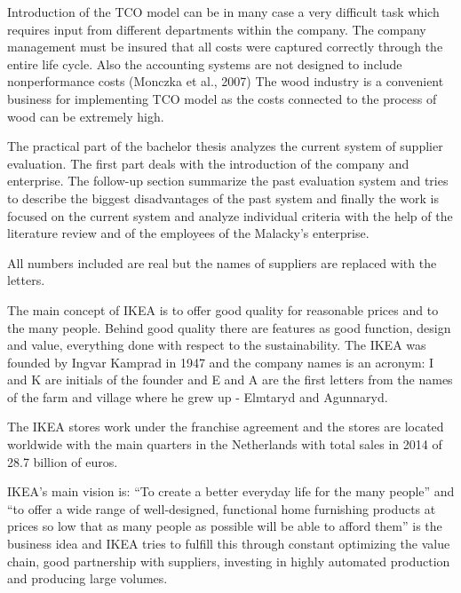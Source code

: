 \documentclass[oneside,12pt]{article}%
\begin{document}
Introduction of the TCO model can be in many case a very difficult task which requires input from different departments within the company. The company management must be insured that all costs were captured correctly through the entire life cycle. Also the accounting systems are not designed to include nonperformance costs (Monczka et al., 2007) The wood industry is a convenient business for implementing TCO model as the costs connected to the process of wood can be extremely high.





The practical part of the bachelor thesis analyzes the current system of supplier evaluation. The first part deals with the introduction of the company and enterprise. The follow-up section summarize the past evaluation system and tries to describe the biggest disadvantages of the past system and finally the work is focused on the current system and analyze individual criteria with the help of the literature review and of the employees of the Malacky’s enterprise. \par
All numbers included are real but the names of suppliers are replaced with the letters.

The main concept of IKEA is to offer good quality for reasonable prices and to the many people. Behind good quality there are features as good function, design and value, everything done with respect to the sustainability. The IKEA was founded by Ingvar Kamprad in 1947 and the company names is an acronym: I and K are initials of the founder and E and A are the first letters from the names of the farm and village where he grew up - Elmtaryd and Agunnaryd. \par
The IKEA stores work under the franchise agreement and the stores are located worldwide with the main quarters in the Netherlands with total sales in 2014 of 28.7 billion of euros. \par
IKEA’s main vision is: “To create a better everyday life for the many people” and “to offer a wide range of well-designed, functional home furnishing products at prices so low that as many people as possible will be able to afford them” is the business idea and IKEA tries to fulfill this through constant optimizing the value chain, good partnership with suppliers, investing in highly automated production and producing large volumes.
\end{document}

